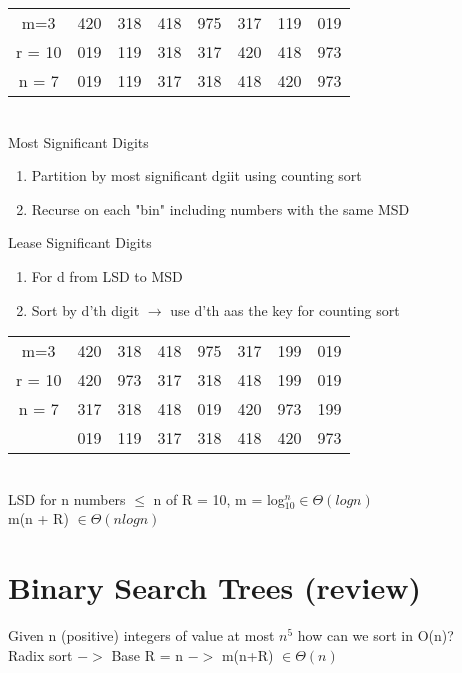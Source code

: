 \documentclass[12pt]{article}
\begin{document}
	\begin{tabular}{c | c | c | c | c | c | c | c }
		m=3 & 420 & 318 & 418 & 975 & 317 & 119 & 019 \\
		r = 10 & 019 & 119 & 318 & 317 & 420 & 418 & 973 \\
		n = 7 & 019 & 119 & 317 & 318 & 418 & 420 & 973 \\
	\end{tabular}\\
	
	Most Significant Digits\\
	\begin{enumerate}
		\item Partition by most significant dgiit using counting sort
		\item Recurse on each "bin" including numbers with the same MSD
	\end{enumerate}
	
	Lease Significant Digits\\
	\begin{enumerate}
		\item For d from LSD to MSD
		\item Sort by d'th digit $\rightarrow$ use d'th aas the key for counting sort
	\end{enumerate}
	\begin{tabular}{c | c | c | c | c | c | c | c }
		m=3    & 420 & 318 & 418 & 975 & 317 & 199 & 019 \\
		r = 10 & 420 & 973 & 317 & 318 & 418 & 199 & 019 \\
		n = 7  & 317 & 318 & 418 & 019 & 420 & 973 & 199 \\
		       & 019 & 119 & 317 & 318 & 418 & 420 & 973 \\
	\end{tabular}\\
	
	LSD for n numbers $\leq$ n of R = 10, m = log$_{10}^n \in \Theta(logn)$\\
	m(n + R) $\in \Theta(nlogn)$\\
	
	\section*{Binary Search Trees (review)}
	
	Given n (positive) integers of value at most $n^5$ how can we sort in O(n)?\\
	
	Radix sort $->$ Base R = n $->$ m(n+R) $\in \Theta(n)$\\
	
\end{document}
